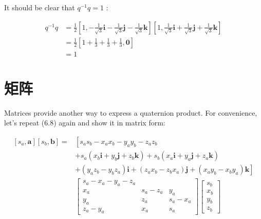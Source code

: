     It should be clear that $q^{-1} q=1$ :

    $$
        \begin{aligned}
            q^{-1} q & =\frac{1}{2}\left[1,-\frac{1}{\sqrt{3}} \mathbf{i}-\frac{1}{\sqrt{3}} \mathbf{j}-\frac{1}{\sqrt{3}} \mathbf{k}\right]\left[1, \frac{1}{\sqrt{3}} \mathbf{i}+\frac{1}{\sqrt{3}} \mathbf{j}+\frac{1}{\sqrt{3}} \mathbf{k}\right] \\
                     & =\frac{1}{2}\left[1+\frac{1}{3}+\frac{1}{3}+\frac{1}{3}, \mathbf{0}\right]                                                                                                                                                     \\
                     & =1
        \end{aligned}
    $$

    \section{矩阵}
    Matrices provide another way to express a quaternion product. For convenience, let's repeat (6.8) again and show it in matrix form:

    $$
        \begin{aligned}
            {\left[s_{a}, \mathbf{a}\right]\left[s_{b}, \mathbf{b}\right]=} & {\left[s_{a} s_{b}-x_{a} x_{b}-y_{a} y_{b}-z_{a} z_{b}\right.}                                                                                                \\
                                                                            & +s_{a}\left(x_{b} \mathbf{i}+y_{b} \mathbf{j}+z_{b} \mathbf{k}\right)+s_{b}\left(x_{a} \mathbf{i}+y_{a} \mathbf{j}+z_{a} \mathbf{k}\right)                    \\
                                                                            & \left.+\left(y_{a} z_{b}-y_{b} z_{a}\right) \mathbf{i}+\left(z_{a} x_{b}-z_{b} x_{a}\right) \mathbf{j}+\left(x_{a} y_{b}-x_{b} y_{a}\right) \mathbf{k}\right] \\
                                                                            & {\left[\begin{array}{rrr}
                            s_{a}-x_{a}-y_{a}-z_{a}                 \\
                            x_{a}       & s_{a}-z_{a} & y_{a}       \\
                            y_{a}       & z_{a}       & s_{a}-x_{a} \\
                            z_{a}-y_{a} & x_{a}       & s_{a}
                        \end{array}\right]\left[\begin{array}{c}
                            s_{b} \\
                            x_{b} \\
                            y_{b} \\
                            z_{b}
                        \end{array}\right] }
        \end{aligned}
    $$

